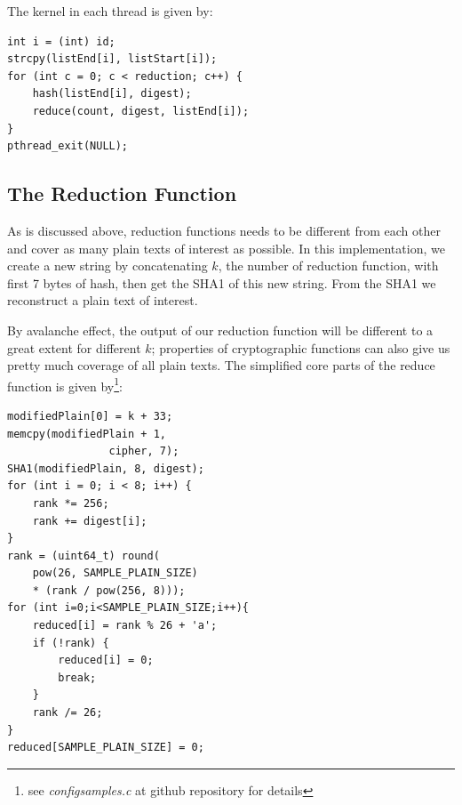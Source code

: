 \documentclass{article}
\begin{document}
\begin{multicols}{2}
The kernel in each thread is given by:

\begin{verbatim}
int i = (int) id;
strcpy(listEnd[i], listStart[i]);
for (int c = 0; c < reduction; c++) {
	hash(listEnd[i], digest);
	reduce(count, digest, listEnd[i]);
}
pthread_exit(NULL);
\end{verbatim}

\subsection{The Reduction Function}
As is discussed above, reduction functions needs to be different from each other and cover as many plain texts of interest as possible. In this implementation, we create a new string by concatenating $k$, the number of reduction function, with first 7 bytes of hash, then get the SHA1 of this new string. From the SHA1 we reconstruct a plain text of interest.

By avalanche effect\cite{wiki:avalanche}, the output of our reduction function will be different to a great extent for different $k$; properties of cryptographic functions can also give us pretty much coverage of all plain texts. The simplified core parts of the reduce function is given by\footnote{see \textit{configsamples.c} at github repository for details}:
\begin{verbatim}
modifiedPlain[0] = k + 33;
memcpy(modifiedPlain + 1, 
				cipher, 7);
SHA1(modifiedPlain, 8, digest);
for (int i = 0; i < 8; i++) {
	rank *= 256;
	rank += digest[i];
}
rank = (uint64_t) round(
	pow(26, SAMPLE_PLAIN_SIZE) 
	* (rank / pow(256, 8)));
for (int i=0;i<SAMPLE_PLAIN_SIZE;i++){
	reduced[i] = rank % 26 + 'a';
	if (!rank) {
		reduced[i] = 0;
		break;
	}
	rank /= 26;
}
reduced[SAMPLE_PLAIN_SIZE] = 0;
\end{verbatim}


\end{multicols}
\end{document}
